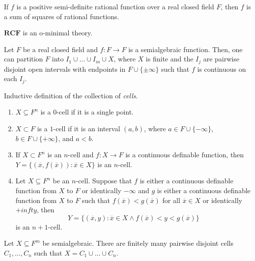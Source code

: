 \documentclass[
	fontsize=10pt, %
]{kaohandt}
\begin{document}
\begin{theorem}
    If $f$ is a positive semi-definite rational function over a real closed field $F$,
    then $f$ is a sum of squares of rational functions.
\end{theorem}

\begin{corollary}
    $\mathbf{RCF}$ is an o-minimal theory.
\end{corollary}

\begin{corollary}
    Let $F$ be a real closed field and $f: F \to F$ is a semialgebraic function.
    Then, one can partition $F$ into $I_1\cup \dots \cup I_m\cup X$,
    where $X$ is finite and the $I_j$ are pairwise disjoint open intervals with endpoints in $F\cup \{\pm\infty\}$ such that $f$ is continuous on each $I_j$.
\end{corollary}

\begin{definition}[Cell]
    Inductive definition of the collection of \emph{cells}.
    \begin{enumerate}[label = {$\bullet$}]
        \item $X \subseteq F^n$ is a $0$-cell if it is a single point.
        \item $X \subset F$ is a $1$-cell if it is an interval $(a,b)$, where $a \in F \cup \{-\infty\}$, $b\in F\cup \{+\infty\}$, and $a < b$.
        \item If $X \subset F^n$ is an $n$-cell and $f: X\to F$ is a continuous definable function, then $Y = \{(\overline{x},f(\overline{x})): \overline{x} \in X\}$ is an $n$-cell.
        \item Let $X \subseteq F^n$ be an $n$-cell. Suppose that $f$ is either a continuous definable function from $X$ to $F$ or identically $-\infty$ and $g$ is either a continuous definable function from $X$ to $F$ such that $f(\overline{x}) < g(\overline{x})$ for all $\overline{x} \in X$ or identically $+infty$, then 
        \[
        Y = \{(\overline{x},y): \overline{x} \in X \land f(\overline{x}) < y < g(\overline{x})\}
        \]
        is an $n+1$-cell.
    \end{enumerate}
\end{definition}

\begin{theorem} 
    Let $X \subseteq F^m$ be semialgebraic.
    There are finitely many pairwise disjoint cells $C_1,\dots,C_n$ such that $X = C_1 \cup \dots \cup C_n$.
\end{theorem}
\end{document}
